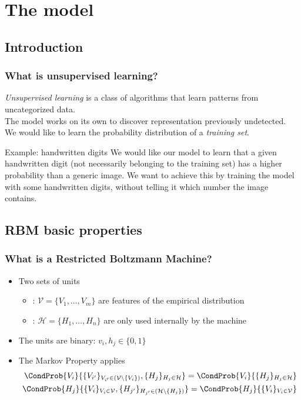 \section{The model}
\subsection{Introduction}

\begin{frame}
  \frametitle{What is unsupervised learning?}
  \emph{Unsupervised learning} is a class of algorithms that learn patterns from \alert{uncategorized data}. \\
  The model works on its own to discover representation previously undetected. \\
  \vspace{15pt}
  We would like to learn the \alert{probability distribution} of a \emph{training set}.
  \pause
  \begin{alertblock}{Example: handwritten digits}
    We would like our model to learn that a given handwritten digit (not necessarily belonging to the training set) has a higher probability
    than a generic image. We want to achieve this by training the model with some handwritten digits, without telling it which number the image contains.
  \end{alertblock}
\end{frame}

\subsection{RBM basic properties}
\begin{frame}
  \frametitle{What is a Restricted Boltzmann Machine?}
  \begin{itemize}
    \item<1-> Two sets of \alert{units}
      \begin{itemize}
        \item {}: \(\mathcal{V} = \{V_1, \dots, V_m\}\) are features of the empirical distribution
        \item {}: \(\mathcal{H} = \{H_1, \dots, H_n\}\) are only used internally by the machine
      \end{itemize}
    \item<2-> The units are \alert{binary}: \(v_i, h_j \in \{0,1\}\)
    \item<3-> The \alert{Markov Property} applies
      \begin{align*}
        \CondProb{V_i}{\{V_{i'}\}_{V_{i'}\in (\mathcal{V} \setminus \{V_i\})}, \{H_j\}_{H_j\in \mathcal{H}}} =
        \CondProb{V_i}{\{H_j\}_{H_j\in \mathcal{H}}} \\
        \CondProb{H_j}{\{V_i\}_{V_i\in \mathcal{V}}, \{H_{j'}\}_{H_{j'}\in (\mathcal{H} \setminus \{H_j\})}} =
        \CondProb{H_j}{\{V_i\}_{V_i\in \mathcal{V}}}
      \end{align*}
  \end{itemize}
	\begin{figure}[<1->]
		\resizebox{0.6\textwidth}{!}{}
	\end{figure}
\end{frame}

